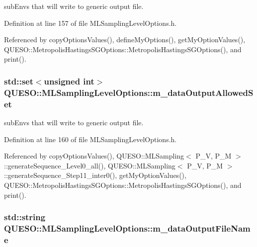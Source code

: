 sub\-Envs that will write to generic output file. 



Definition at line 157 of file M\-L\-Sampling\-Level\-Options.\-h.



Referenced by copy\-Options\-Values(), define\-My\-Options(), get\-My\-Option\-Values(), Q\-U\-E\-S\-O\-::\-Metropolis\-Hastings\-S\-G\-Options\-::\-Metropolis\-Hastings\-S\-G\-Options(), and print().

\hypertarget{class_q_u_e_s_o_1_1_m_l_sampling_level_options_aeead47ca5a3ccd405bae013a344d1dce}{
\subsubsection[{m\-\_\-data\-Output\-Allowed\-Set}]{\setlength{\rightskip}{0pt plus 5cm}std\-::set$<$unsigned int$>$ Q\-U\-E\-S\-O\-::\-M\-L\-Sampling\-Level\-Options\-::m\-\_\-data\-Output\-Allowed\-Set}}\label{class_q_u_e_s_o_1_1_m_l_sampling_level_options_aeead47ca5a3ccd405bae013a344d1dce}


sub\-Envs that will write to generic output file. 



Definition at line 160 of file M\-L\-Sampling\-Level\-Options.\-h.



Referenced by copy\-Options\-Values(), Q\-U\-E\-S\-O\-::\-M\-L\-Sampling$<$ P\-\_\-\-V, P\-\_\-\-M $>$\-::generate\-Sequence\-\_\-\-Level0\-\_\-all(), Q\-U\-E\-S\-O\-::\-M\-L\-Sampling$<$ P\-\_\-\-V, P\-\_\-\-M $>$\-::generate\-Sequence\-\_\-\-Step11\-\_\-inter0(), get\-My\-Option\-Values(), Q\-U\-E\-S\-O\-::\-Metropolis\-Hastings\-S\-G\-Options\-::\-Metropolis\-Hastings\-S\-G\-Options(), and print().

\hypertarget{class_q_u_e_s_o_1_1_m_l_sampling_level_options_a56871c5760820c93526948a6e1c024e5}{
\subsubsection[{m\-\_\-data\-Output\-File\-Name}]{\setlength{\rightskip}{0pt plus 5cm}std\-::string Q\-U\-E\-S\-O\-::\-M\-L\-Sampling\-Level\-Options\-::m\-\_\-data\-Output\-File\-Name}}\label{class_q_u_e_s_o_1_1_m_l_sampling_level_options_a56871c5760820c93526948a6e1c024e5}


